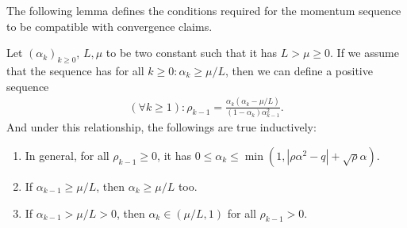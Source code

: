 \documentclass[12pt]{article}
\begin{document}
    The following lemma defines the conditions required for the momentum sequence to be compatible with convergence claims. 
    \begin{lemma}\label{lemma:seq-properties}
        Let $(\alpha_k)_{k \ge 0}$, $L, \mu$ to be two constant such that it has $L > \mu \ge 0$. 
        If we assume that the sequence has for all $k \ge 0: \alpha_k \ge \mu/L$, then we can define a positive sequence 
        \begin{align*}
            (\forall k \ge 1): \rho_{k - 1} = \frac{\alpha_k(\alpha_k - \mu/L)}{(1 - \alpha_k)\alpha_{k - 1}^2}. 
        \end{align*}
        And under this relationship, the followings are true inductively: 
        \begin{enumerate}[nosep]
            \item In general, for all $\rho_{k - 1} \ge 0$, it has $0\le \alpha_k \le \min\left(1, |\rho\alpha^2 - q| + \sqrt{\rho}\alpha\right)$. 
            \item If $\alpha_{k - 1} \ge \mu/L$, then $\alpha_k \ge \mu/L$ too. 
            \item If $\alpha_{k - 1} > \mu/L > 0$, then $\alpha_k \in (\mu/L, 1)$ for all $\rho_{k - 1} > 0$. 
        \end{enumerate}
    \end{lemma}
\end{document}
